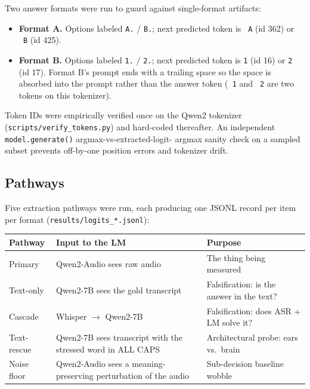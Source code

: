 \documentclass[11pt]{article}
\begin{document}
Two answer formats were run to guard against single-format artifacts:

\begin{itemize}
    \item \textbf{Format A.} Options labeled \texttt{A.} /
    \texttt{B.}; next predicted token is \texttt{\ A} (id 362) or
    \texttt{\ B} (id 425).
    \item \textbf{Format B.} Options labeled \texttt{1.} /
    \texttt{2.}; next predicted token is \texttt{1} (id 16) or
    \texttt{2} (id 17). Format B's prompt ends with a trailing
    space so the space is absorbed into the prompt rather than the
    answer token (\texttt{\ 1} and \texttt{\ 2} are two tokens on
    this tokenizer).
\end{itemize}

Token IDs were empirically verified once on the Qwen2 tokenizer
(\texttt{scripts/verify\_tokens.py}) and hard-coded thereafter. An
independent \texttt{model.generate()} argmax-vs-extracted-logit-
argmax sanity check on a sampled subset prevents off-by-one position
errors and tokenizer drift.

\subsection{Pathways}

Five extraction pathways were run, each producing one JSONL record
per item per format (\texttt{results/logits\_*.jsonl}):

\begin{center}
\small
\begin{tabular}{p{2.4cm} p{6cm} p{6cm}}
\toprule
\textbf{Pathway} & \textbf{Input to the LM} & \textbf{Purpose} \\
\midrule
Primary & Qwen2-Audio sees raw audio & The thing being measured \\
Text-only & Qwen2-7B sees the gold transcript & Falsification: is the answer in the text? \\
Cascade & Whisper $\rightarrow$ Qwen2-7B & Falsification: does ASR + LM solve it? \\
Text-rescue & Qwen2-7B sees transcript with the stressed word in ALL CAPS & Architectural probe: ears vs.\ brain \\
Noise floor & Qwen2-Audio sees a meaning-preserving perturbation of the audio & Sub-decision baseline wobble \\
\bottomrule
\end{tabular}
\end{center}
\end{document}
